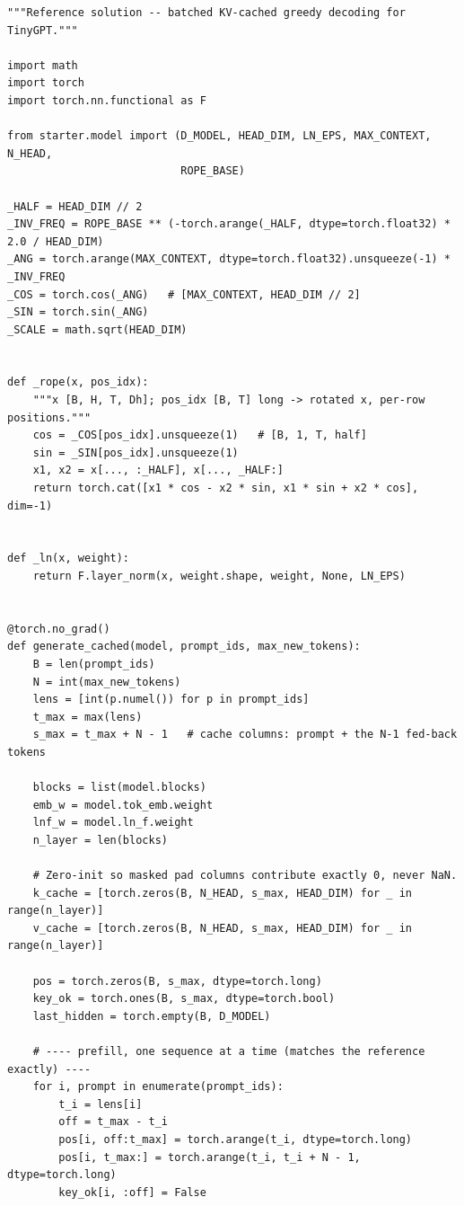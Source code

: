 \documentclass[11pt]{article}
\begin{document}
\begin{lstlisting}[style=py]
"""Reference solution -- batched KV-cached greedy decoding for TinyGPT."""

import math
import torch
import torch.nn.functional as F

from starter.model import (D_MODEL, HEAD_DIM, LN_EPS, MAX_CONTEXT, N_HEAD,
                           ROPE_BASE)

_HALF = HEAD_DIM // 2
_INV_FREQ = ROPE_BASE ** (-torch.arange(_HALF, dtype=torch.float32) * 2.0 / HEAD_DIM)
_ANG = torch.arange(MAX_CONTEXT, dtype=torch.float32).unsqueeze(-1) * _INV_FREQ
_COS = torch.cos(_ANG)   # [MAX_CONTEXT, HEAD_DIM // 2]
_SIN = torch.sin(_ANG)
_SCALE = math.sqrt(HEAD_DIM)


def _rope(x, pos_idx):
    """x [B, H, T, Dh]; pos_idx [B, T] long -> rotated x, per-row positions."""
    cos = _COS[pos_idx].unsqueeze(1)   # [B, 1, T, half]
    sin = _SIN[pos_idx].unsqueeze(1)
    x1, x2 = x[..., :_HALF], x[..., _HALF:]
    return torch.cat([x1 * cos - x2 * sin, x1 * sin + x2 * cos], dim=-1)


def _ln(x, weight):
    return F.layer_norm(x, weight.shape, weight, None, LN_EPS)


@torch.no_grad()
def generate_cached(model, prompt_ids, max_new_tokens):
    B = len(prompt_ids)
    N = int(max_new_tokens)
    lens = [int(p.numel()) for p in prompt_ids]
    t_max = max(lens)
    s_max = t_max + N - 1   # cache columns: prompt + the N-1 fed-back tokens

    blocks = list(model.blocks)
    emb_w = model.tok_emb.weight
    lnf_w = model.ln_f.weight
    n_layer = len(blocks)

    # Zero-init so masked pad columns contribute exactly 0, never NaN.
    k_cache = [torch.zeros(B, N_HEAD, s_max, HEAD_DIM) for _ in range(n_layer)]
    v_cache = [torch.zeros(B, N_HEAD, s_max, HEAD_DIM) for _ in range(n_layer)]

    pos = torch.zeros(B, s_max, dtype=torch.long)
    key_ok = torch.ones(B, s_max, dtype=torch.bool)
    last_hidden = torch.empty(B, D_MODEL)

    # ---- prefill, one sequence at a time (matches the reference exactly) ----
    for i, prompt in enumerate(prompt_ids):
        t_i = lens[i]
        off = t_max - t_i
        pos[i, off:t_max] = torch.arange(t_i, dtype=torch.long)
        pos[i, t_max:] = torch.arange(t_i, t_i + N - 1, dtype=torch.long)
        key_ok[i, :off] = False


\end{lstlisting}
\end{document}
